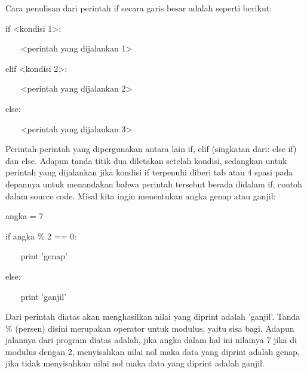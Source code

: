 \vspace{12pt}
\noindent 
Cara penulisan dari perintah if secara garis besar adalah seperti berikut: \par
\noindent 
if <kondisi 1>: \par
\vspace{12pt}
\noindent 
~~~ <perintah yang dijalankan 1> \par
\vspace{12pt}
\noindent 
elif <kondisi 2>: \par
\vspace{12pt}
\noindent 
~~~ <perintah yang dijalankan 2> \par
\vspace{12pt}
\noindent 
else: \par
\vspace{12pt}
\noindent 
~~~ <perintah yang dijalankan 3> \par
\vspace{12pt}
\noindent 
Perintah-perintah yang dipergunakan antara lain $  $if, $  $elif $  $(singkatan dari: $  $else if) dan $  $else. Adapun tanda titik dua diletakan setelah kondisi, sedangkan untuk perintah yang dijalankan jika kondisi if terpenuhi diberi $  $tab $  $atau $  $4 spasi $  $pada depannya untuk menandakan bahwa perintah tersebut berada didalam if, contoh dalam source code. Misal kita ingin menentukan angka genap atau ganjil: \par
\vspace{12pt}
\noindent 
angka = 7 \par
\vspace{12pt}
\noindent 
if angka  $  \%  $ 2 == 0: \par
\vspace{12pt}
\noindent 
~~~ print 'genap' \par
\vspace{12pt}
\noindent 
else: \par
\vspace{12pt}
\noindent 
~~~ print 'ganjil' \par
\vspace{12pt}
\noindent 
Dari perintah diatas akan menghasilkan nilai yang diprint adalah 'ganjil'. Tanda $  $ $  \%  $ $  $(persen) disini merupakan operator untuk modulus, yaitu sisa bagi. Adapun jalannya dari program diatas adalah, jika angka dalam hal ini nilainya 7 jika di modulus dengan 2, menyisahkan nilai nol maka data yang diprint adalah genap, jika tidak menyisahkan nilai nol maka data yang diprint adalah ganjil. \par
